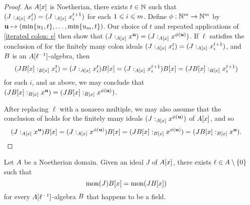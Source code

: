 \documentclass{article}
\begin{document}
\begin{proof}
   As $A[x]$ is Noetherian, there exists $t \in \mathbb{N}$ such that $(J:_{A[x]}x_i^t)=(J:_{A[x]}x_i^{t+1})$ for each $1 \leqslant i \leqslant m$.  Define $\phi:  \mathbb{N}^m \to \mathbb{N}^m$ by $\mathbf{u} \mapsto (\min\{u_1, t\}, \ldots, \min \{u_m,t\})$.  Our choice of $t$ and repeated applications of \eqref{iterated colon: e} then show that $(J:_{A[x]}x^{\mathbf{u}}) = (J:_{A[x]}x^{\phi(\mathbf{u})})$.
   If $\ell$ satisfies the conclusion of  for the finitely many colon ideals $(J:_{A[x]}x_i^t)=(J:_{A[x]}x_i^{t+1})$, and $B$ is an $A[\ell^{-1}]$-algebra, then
 \[
       (J B[x]:_{B[x]} x_i^{t}) = (J:_{A[x]}x_i^{t})B[x]
                               = (J:_{A[x]}x_i^{t+1})B[x]
                               =(J B[x]:_{B[x]} x_i^{t+1})
   \]
   for each $i$, and as above, we may conclude that $(J B[x]:_{B[x]}x^{\mathbf{u}}) = (J B[x]:_{B[x]}x^{\phi(\mathbf{u})})$.

   After replacing $\ell$ with a nonzero multiple, we may also assume that the conclusion of  holds for the finitely many ideals $(J:_{A[x]} x^{\phi(\mathbf{u})})$ of $A[x]$, and so
\[ (J:_{A[x]} x^{\mathbf{u}})B[x] = (J:_{A[x]} x^{\phi(\mathbf{u})})B[x] = (J B[x]:_{B[x]} x^{\phi(\mathbf{u})}) = (J B[x]:_{B[x]} x^{\mathbf{u}}). \qedhere\]
\end{proof}

\begin{theorem}
\label{mon-operation-general-expansion: T}
Let $A$ be a Noetherian domain.  Given an ideal $J$ of $A[x]$, there exists $\ell \in A \setminus \{0\}$ such that 
\[ \operatorname{mon}(J) B[x] = \operatorname{mon}(J B[x])\]
for every $A[\ell^{-1}]$-algebra $B$ {that happens to be a field}.
\end{theorem}
\end{document}
